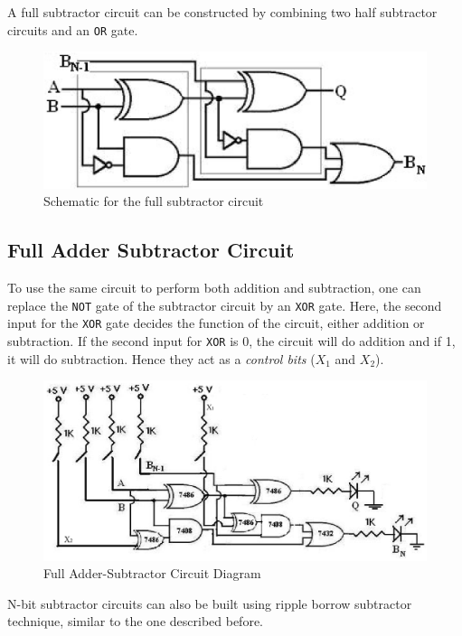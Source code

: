 A full subtractor circuit can be constructed by combining two half subtractor circuits and an \verb|OR| gate.

\begin{figure}[H]
    \centering
    \includegraphics[width=0.7\columnwidth]{images/full-sub.png}
    \caption{Schematic for the full subtractor circuit}
    \label{full-sub}
\end{figure}

\subsection*{Full Adder Subtractor Circuit}
To use the same circuit to perform both addition and subtraction, one can replace the \verb|NOT| gate of the subtractor circuit by an \verb|XOR| gate. Here, the second input for the \verb|XOR| gate decides the function of the circuit, either addition or subtraction. If the second input for \verb|XOR| is 0, the circuit will do addition and if 1, it will do subtraction. Hence they act as a \textit{control bits} ($X_1$ and $X_2$).

\begin{figure}[H]
    \centering
    \includegraphics[width=1\columnwidth]{images/full-comb.png}
    \caption{Full Adder-Subtractor Circuit Diagram}
    \label{full-add-sub}
\end{figure}

N-bit subtractor circuits can also be built using ripple borrow subtractor technique, similar to the one described before.
